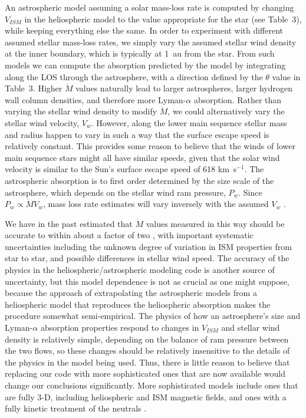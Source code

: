 \documentclass[preprint]{aastex}
\begin{document}
     An astrospheric model assuming a solar mass-loss rate is
computed by changing $V_{ISM}$ in the heliospheric model to the
value appropriate for the star (see Table~3), while keeping
everything else the same.  In order to experiment with different assumed
stellar mass-loss rates, we simply vary the assumed stellar wind
density at the inner boundary, which is typically at 1~au from the
star.  From such models we can compute
the absorption predicted by the model by integrating along the
LOS through the astrosphere, with a direction defined by the
$\theta$ value in Table~3.  Higher $\dot{M}$ values naturally
lead to larger astrospheres, larger hydrogen wall column
densities, and therefore more Lyman-$\alpha$ absorption.
Rather than varying the stellar wind density to modify
$\dot{M}$, we could alternatively vary the stellar wind velocity, $V_w$.
However, along the lower main sequence stellar mass and radius happen
to vary in such a way that the surface escape speed is relatively
constant.  This provides some reason to believe that the winds of
lower main sequence stars might all have similar speeds, given that
the solar wind velocity is similar to the Sun's surface escape speed
of 618 km~s$^{-1}$.
The astrospheric absorption is to first order determined by the
size scale of the astrosphere, which depends on the stellar wind
ram pressure, $P_w$.  Since $P_w\propto \dot{M}V_w$, mass loss
rate estimates will vary inversely with the assumed $V_w$ \citep{bew02}.

     We have in the past estimated that $\dot{M}$ values
measured in this way should be accurate to within about a factor of two
\citep{bew05a}, with important systematic uncertainties
including the unknown degree of variation in ISM properties from
star to star, and possible differences in stellar wind speed.
The accuracy of the physics in the heliospheric/astrospheric
modeling code is another source of uncertainty, but this model
dependence is not as crucial as one might suppose, because the
approach of extrapolating the astrospheric models from a
heliospheric model that reproduces the heliospheric absorption
makes the procedure somewhat semi-empirical.  The physics of
how an astrosphere's size and Lyman-$\alpha$ absorption
properties respond to changes in $V_{ISM}$ and stellar wind
density is relatively simple, depending on the balance of ram
pressure between the two flows, so these changes should be
relatively insensitive to the details of the physics in the
model being used.  Thus, there is little reason to believe
that replacing our code with more sophisticated ones that
are now available would change our conclusions significantly.
More sophisticated models include ones that are fully 3-D,
including heliospheric and ISM magnetic fields, and ones
with a fully kinetic treatment of the neutrals
\citep[e.g.,][]{vvi09,nvp13,mo15}.
\end{document}
